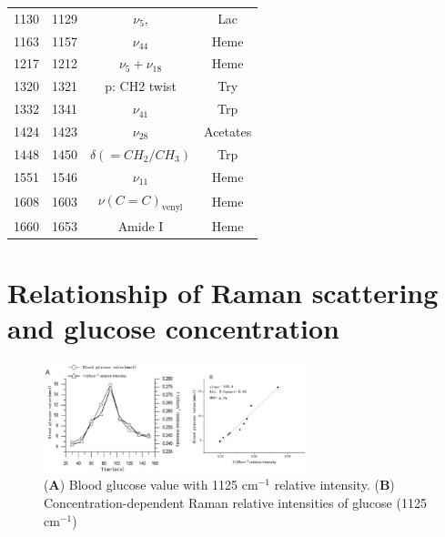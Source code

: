 \begin{table}[]
\begin{center}
\begin{tabular}{cccc}
    1130                 & 1129          & $\nu_5$,                      & Lac                         \\
    1163                 & 1157          & $\nu_{44}$                    & Heme                        \\
    1217                 & 1212          & $\nu_5 + \nu_{18}$            & Heme                        \\
    1320                 & 1321          & p: CH2 twist                  & Try                         \\
    1332                 & 1341          & $\nu_{41}$                    & Trp                         \\
    1424                 & 1423          & $\nu_{28}$                    & Acetates                    \\
    1448                 & 1450          & $\delta(={CH}_{2}/{CH}_{3})$  & Trp                         \\
    1551                 & 1546          & $\nu_{11}$                    & Heme                        \\
    1608                 & 1603          & $\nu(C=C)_{\text{venyl}}$     & Heme                        \\
    1660                 & 1653          & Amide I                       & Heme                        \\
    \hline
    \end{tabular}
    \label{tab:bloodpeak}
    \end{center}
\end{table}



\section{Relationship of Raman scattering and glucose concentration}

\begin{figure}
    \caption{(\textbf{A}) Blood glucose value with 1125 $\text{cm}^{-1}$ relative intensity. (\textbf{B}) Concentration-dependent Raman relative intensities of glucose (1125 $\text{cm}^{-1}$) \citep{solutionGlucose}}
    \centerline{\includegraphics[width=3in]{figures/bloodGlucose-relative1125.png}}
    \label{fig:bloodGlucose-relative1125}
\end{figure}

